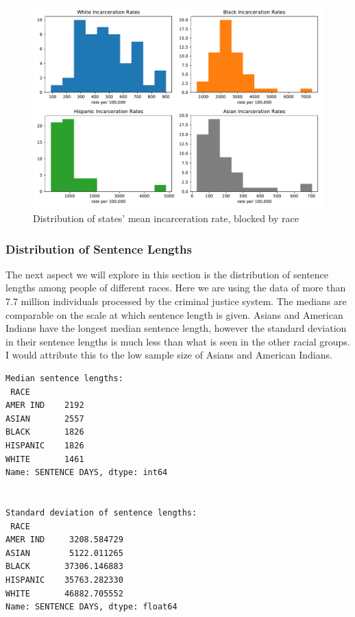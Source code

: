 \documentclass[11pt]{article}
\begin{document}
\begin{figure}[H]
    \centering
    \includegraphics[width=\textwidth]{images/state_incar_rates.pdf}
    \caption{Distribution of states' mean incarceration rate, blocked by race}
    \label{fig:my_label}
\end{figure}
    
    \hypertarget{distribution-of-sentence-lengths}{%
\subsubsection{Distribution of Sentence
Lengths}\label{distribution-of-sentence-lengths}}

The next aspect we will explore in this section is the distribution of
sentence lengths among people of different races. Here we are using the
data of more than 7.7 million individuals processed by the criminal
justice system. The medians are comparable on the scale at which
sentence length is given. Asians and American Indians have the longest
median sentence length, however the standard deviation in their sentence
lengths is much less than what is seen in the other racial groups. I
would attribute this to the low sample size of Asians and American
Indians.

    \begin{Verbatim}[commandchars=\\\{\}]
Median sentence lengths:
 RACE
AMER IND    2192
ASIAN       2557
BLACK       1826
HISPANIC    1826
WHITE       1461
Name: SENTENCE DAYS, dtype: int64


Standard deviation of sentence lengths:
 RACE
AMER IND     3208.584729
ASIAN        5122.011265
BLACK       37306.146883
HISPANIC    35763.282330
WHITE       46882.705552
Name: SENTENCE DAYS, dtype: float64

    \end{Verbatim}
\end{document}
